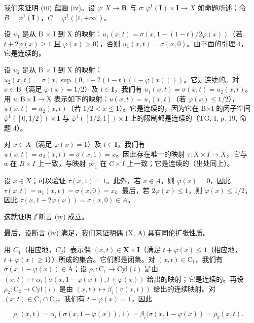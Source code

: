 我们来证明 (iii) 蕴涵 (iv)。设 \(\varphi\colon X\to\mathbf{R}\) 与 \(\sigma\colon\overline{\varphi}^{1}(\mathbf{I})\times\mathbf{I}\to X\) 如命题所述；令 \(B=\overline{\varphi}^{1}(\mathbf{I})\)，\(C=\overline{\varphi}^{1}([1,+\infty[)\)。

设 \(u_1\) 是从 B × I 到 X 的映射：\(u_1(x,t) = \sigma(x,1 - (1 - t)/2\varphi(x))\)（若 \(t + 2\varphi(x) \geqslant 1\) 且 \(\varphi(x) > 0\)），否则 \(u_1(x,t) = \sigma(x,0)\)。由下面的引理 4，它是连续的。

设 \(u_2\) 是从 B × I 到 X 的映射：\(u_2(x,t)=\sigma(x,\sup(0,1-2(1-t)(1-\varphi(x))))\)。它是连续的。对 \(x\in\mathrm{B}\)（满足 \(\varphi(x)=1/2\)）及 \(t\in\mathbf{I}\)，我们有 \(u_1(x,t)=\sigma(x,t)=u_2(x,t)\)。用 \(u:\mathrm{B}\times\mathbf{I}\to\mathrm{X}\) 表示如下的映射：\(u(x,t)=u_1(x,t)\)（若 \(\varphi(x)\leqslant1/2\)），\(u(x,t)=u_2(x,t)\)（若 \(1/2<x\leqslant1\)）。它是连续的，因为它在 B×I 的闭子空间 \(\overline{\varphi}^{1}([0,1/2])\times\mathbf{I}\) 与 \(\overline{\varphi}^{1}([1/2,1])\times\mathbf{I}\) 上的限制都是连续的（TG, I, p. 19, 命题 4）。

对 \(x\in X\)（满足 \(\varphi(x)=1\)）及 \(t\in\mathbf{I}\)，我们有 \(u(x,t)=u_2(x,t)=\sigma(x,1)=x\)。因此存在唯一的映射 \(\tau:X\times I\to X\)，它与 u 在 \(B\times I\) 上一致，与映射 \(\mathrm{pr}_1\) 在 \(C\times I\) 上一致；它是连续的（出处同上）。

设 \(x \in X\)；可以验证 \(\tau(x,1) = 1\)。此外，若 \(x \in A\)，则 \(\varphi(x) = 0\)，因此 \(\tau(x,t) = u_{1}(x,t) = \sigma(x,0) = x\)。最后，若 \(2\varphi(x) \leqslant 1\)，则 \(\varphi(x) \leqslant 1/2\)，因此 \(\tau(x,1 - 2\varphi(x)) = \sigma(x,0) \in A\)。

这就证明了断言 (iv) 成立。

最后，设断言 (iv) 满足，我们来证明偶 (X, A) 具有同伦扩张性质。

用 \(C_{1}\)（相应地，\(C_{2}\)）表示偶 \((x,t)\in\mathbf{X}\times\mathbf{I}\)（满足 \(t+\varphi(x)\leqslant1\)（相应地，\(t+\varphi(x)\geqslant1\)））所成的集合。它们都是闭集。对 \((x,t)\in\mathrm{C}_{1}\)，我们有 \(\sigma(x,1-\varphi(x))\in\mathrm{A}\)；设 \(\rho_{1}\colon\mathrm{C}_{1}\to\mathrm{Cyl}(i)\) 是由 \((x,t)\mapsto\alpha_{i}(\sigma(x,1-\varphi(x)),t+\varphi(x))\) 给出的映射；它是连续的。再设 \(\rho_{2}\colon\mathrm{C}_{2}\to\mathrm{Cyl}(i)\) 是由 \((x,t)\mapsto\beta_{i}(\sigma(x,t))\) 给出的连续映射。对 \((x,t)\in\mathrm{C}_{1}\cap\mathrm{C}_{2}\)，我们有 \(t+\varphi(x)=1\)，因此

\[
\rho_ {1} (x, t) = \alpha_ {i} (\sigma (x, 1 - \varphi (x)), 1) = \beta_ {i} (\sigma (x, 1 - \varphi (x)) = \rho_ {2} (x, t).
\]

